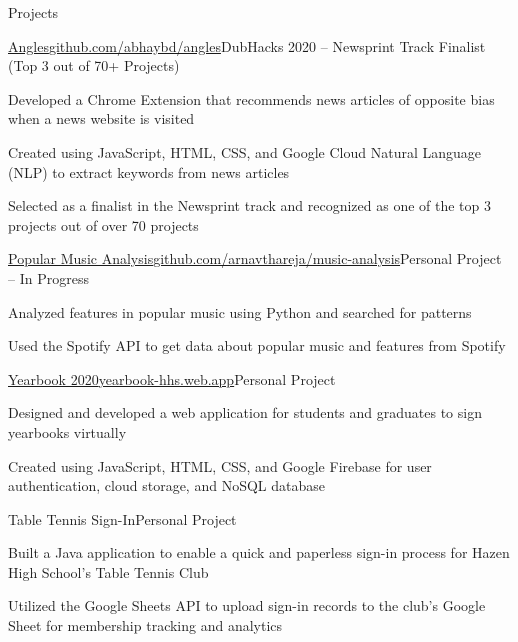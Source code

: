 \documentclass{resume} %
\begin{document}

\begin{rSection}{Projects}

\begin{project}{\href{https://github.com/abhaybd/angles}{Angles}}{\href{https://github.com/abhaybd/angles}{github.com/abhaybd/angles}}{DubHacks 2020 – Newsprint Track Finalist (Top 3 out of 70+ Projects)}
\item Developed a Chrome Extension that recommends news articles of opposite bias when a news website is visited
\item Created using JavaScript, HTML, CSS, and Google Cloud Natural Language (NLP) to extract keywords from news articles
\item Selected as a finalist in the Newsprint track and recognized as one of the top 3 projects out of over 70 projects
\end{project}

\begin{project}{\href{https://github.com/arnavthareja/music-analysis}{Popular Music Analysis}}{\href{https://github.com/arnavthareja/music-analysis}{github.com/arnavthareja/music-analysis}}{Personal Project – In Progress}
\item Analyzed features in popular music using Python and searched for patterns
\item Used the Spotify API to get data about popular music and features from Spotify
\end{project}

\begin{project}{\href{https://yearbook-hhs.web.app/}{Yearbook 2020}}{\href{https://yearbook-hhs.web.app/}{yearbook-hhs.web.app}}{Personal Project}
\item Designed and developed a web application for students and graduates to sign yearbooks virtually
\item Created using JavaScript, HTML, CSS, and Google Firebase for user authentication, cloud storage, and NoSQL database
\end{project}

\begin{project}{Table Tennis Sign-In}{}{Personal Project}
\item Built a Java application to enable a quick and paperless sign-in process for Hazen High School's Table Tennis Club
\item Utilized the Google Sheets API to upload sign-in records to the club's Google Sheet for membership tracking and analytics
\end{project}

\end{rSection}
\end{document}
